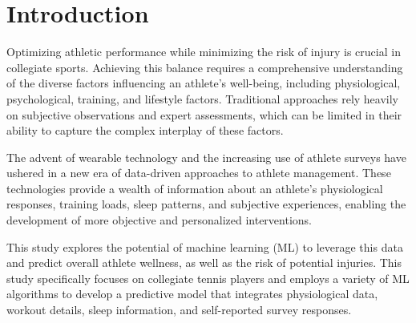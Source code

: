 \documentclass[manuscript,acmsmall,review,screen,authorversion=true]{acmart}
\begin{document}


\maketitle

\section{Introduction}
Optimizing athletic performance while minimizing the risk of injury is crucial in collegiate sports. Achieving this balance requires a comprehensive understanding of the diverse factors influencing an athlete's well-being, including physiological, psychological, training, and lifestyle factors. Traditional approaches rely heavily on subjective observations and expert assessments, which can be limited in their ability to capture the complex interplay of these factors.

The advent of wearable technology and the increasing use of athlete surveys have ushered in a new era of data-driven approaches to athlete management. These technologies provide a wealth of information about an athlete's physiological responses, training loads, sleep patterns, and subjective experiences, enabling the development of more objective and personalized interventions.

This study explores the potential of machine learning (ML) to leverage this data and predict overall athlete wellness, as well as the risk of potential injuries. 
This study specifically focuses on collegiate tennis players and employs a variety of ML algorithms to develop a predictive model that integrates physiological data, workout details, sleep information, and self-reported survey responses. 
\end{document}
